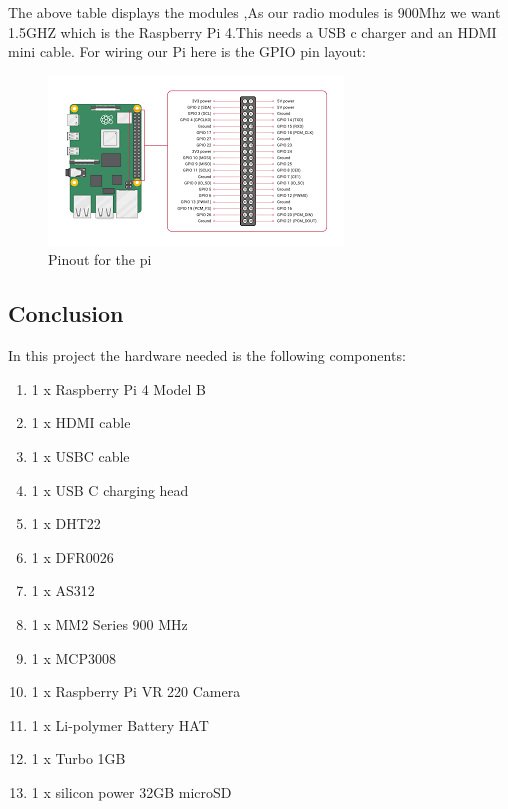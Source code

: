 The above table displays the modules ,As our radio modules is 900Mhz  we want  1.5GHZ which is the Raspberry Pi 4.This needs a USB\- c charger and an HDMI mini cable.
For wiring our Pi here is  the GPIO pin layout:
\begin{figure}[h!]
	\centering
	\includegraphics[width=0.8\linewidth]{Images/Pinout_of_pi.png}
	\caption*{Pinout for  the  pi}
	\label{Pinout for  the  pi}
\end{figure}
\label{pi os}
\subsection{Conclusion}
In this project the hardware needed is the  following components:
\begin{enumerate}
	\item 1 x Raspberry Pi 4 Model B 
	\item 1 x HDMI cable
	\item 1 x USB\-C cable
	\item 1 x USB \-C charging head
	\item 1 x DHT22
	\item 1 x DFR0026
	\item 1 x AS312
	\item 1 x MM2 Series 900 MHz
	\item 1 x MCP3008
	\item 1 x Raspberry Pi VR 220 Camera
	\item  1 x Li-polymer Battery HAT 
	\item 1 x Turbo 1GB
	\item 1 x silicon power 32GB  microSD
	
	
\end{enumerate}